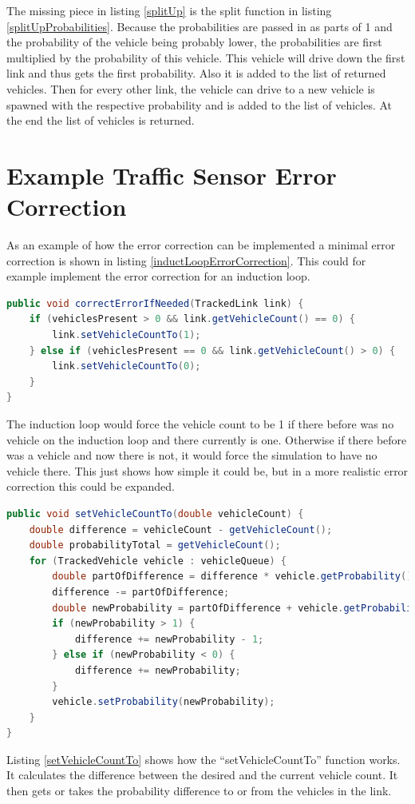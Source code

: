 The missing piece in listing \ref{splitUp} is the split function in listing \ref{splitUpProbabilities}. Because the probabilities are passed in as parts of 1 and the probability of the vehicle being probably lower, the probabilities are first multiplied by the probability of this vehicle. This vehicle will drive down the first link and thus gets the first probability. Also it is added to the list of returned vehicles. Then for every other link, the vehicle can drive to a new vehicle is spawned with the respective probability and is added to the list of vehicles. At the end the list of vehicles is returned.

\section{Example Traffic Sensor Error Correction}

As an example of how the error correction can be implemented a minimal error correction is shown in listing \ref{inductLoopErrorCorrection}. This could for example implement the error correction for an induction loop.

\vspace{0.5em}

\begin{lstlisting}[caption={Induction Loop Error Correction}, label=inductLoopErrorCorrection, language=Java]
public void correctErrorIfNeeded(TrackedLink link) {
	if (vehiclesPresent > 0 && link.getVehicleCount() == 0) {
		link.setVehicleCountTo(1);
	} else if (vehiclesPresent == 0 && link.getVehicleCount() > 0) {
		link.setVehicleCountTo(0);
	}
}
\end{lstlisting}

The induction loop would force the vehicle count to be 1 if there before was no vehicle on the induction loop and there currently is one. Otherwise if there before was a vehicle and now there is not, it would force the simulation to have no vehicle there. This just shows how simple it could be, but in a more realistic error correction this could be expanded.

\vspace{0.5em}

\begin{lstlisting}[caption={Set Vehicle Count Function of TrackedLink}, label=setVehicleCountTo, language=Java]
public void setVehicleCountTo(double vehicleCount) {
	double difference = vehicleCount - getVehicleCount();
	double probabilityTotal = getVehicleCount();
	for (TrackedVehicle vehicle : vehicleQueue) {
		double partOfDifference = difference * vehicle.getProbability() / probabilityTotal;
		difference -= partOfDifference;
		double newProbability = partOfDifference + vehicle.getProbability();
		if (newProbability > 1) {
			difference += newProbability - 1;
		} else if (newProbability < 0) {
			difference += newProbability;
		}
		vehicle.setProbability(newProbability);
	}
}
\end{lstlisting}

Listing \ref{setVehicleCountTo} shows how the ``setVehicleCountTo'' function works. It calculates the difference between the desired and the current vehicle count. It then gets or takes the probability difference to or from the vehicles in the link.